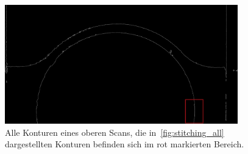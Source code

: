\begin{figure}[h]
    \centering
    \includegraphics[width=0.9\textwidth]{images/all_cons_top_red.png} %
    \caption{Alle Konturen eines oberen Scans, die in~\ref{fig:stitching_all} dargestellten
    Konturen befinden sich im rot markierten Bereich.}
    \label{fig:con_area}
\end{figure}

